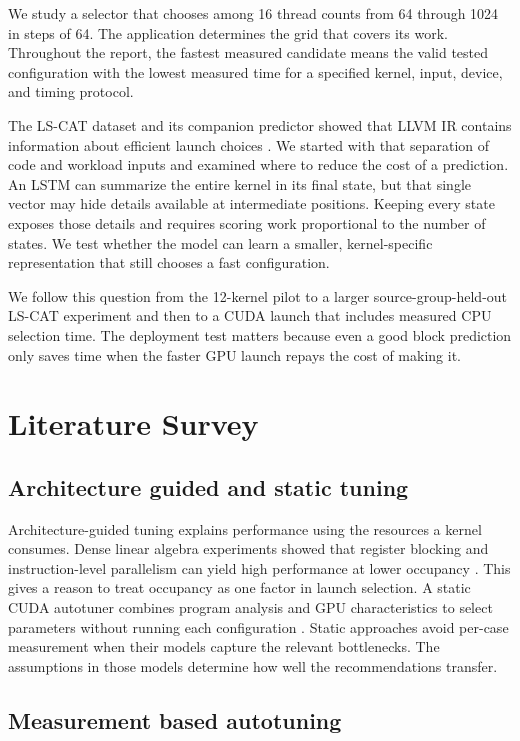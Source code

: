 \documentclass[11pt,letterpaper]{article}
\begin{document}
We study a selector that chooses among 16 thread counts from 64 through 1024 in steps of 64. The application
determines the grid that covers its work. Throughout the report, the fastest measured candidate means the
valid tested configuration with the lowest measured time for a specified kernel, input, device, and timing
protocol.

The LS-CAT dataset and its companion predictor showed that LLVM IR contains information about efficient
launch choices \citep{bjertnes2021a,bjertnes2021b}. We started with that separation of code and
workload inputs and examined where to reduce the cost of a prediction. An LSTM can summarize the entire
kernel in its final state, but that single vector may hide details available at intermediate positions.
Keeping every state exposes those details and requires scoring work proportional to the number of states. We
test whether the model can learn a smaller, kernel-specific representation that still chooses a fast
configuration.

We follow this question from the 12-kernel pilot to a larger source-group-held-out LS-CAT experiment and
then to a CUDA launch that includes measured CPU selection time. The deployment test matters because even a
good block prediction only saves time when the faster GPU launch repays the cost of making it.

\section{Literature Survey}

\subsection{Architecture guided and static tuning}

Architecture-guided tuning explains performance using the resources a kernel consumes. Dense linear algebra
experiments showed that register blocking and instruction-level parallelism can yield high performance at
lower occupancy \citep{volkov2008}. This gives a reason to treat occupancy as one factor in launch
selection. A static CUDA autotuner combines program analysis and GPU characteristics to select parameters
without running each configuration \citep{lim2017}. Static approaches avoid per-case measurement when their
models capture the relevant bottlenecks. The assumptions in those models determine how well the
recommendations transfer.

\subsection{Measurement based autotuning}
\end{document}
